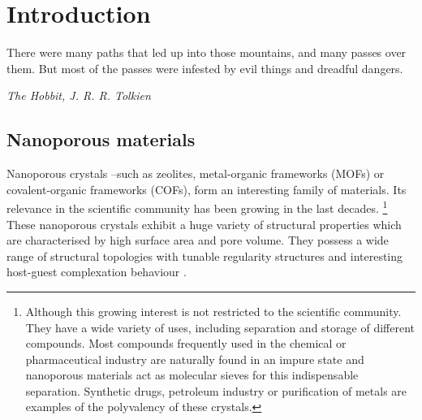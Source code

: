 
\chapter{Introduction}
\label{chap_intro}
\epigraph{There were many paths that led up into those mountains, and many passes over them. But most of the passes were infested by evil things and dreadful dangers.}{\textit{The Hobbit, J. R. R. Tolkien}}
\section{Nanoporous materials}
Nanoporous crystals --such as zeolites, metal-organic frameworks (MOFs) or covalent-organic frameworks (COFs), form an interesting family of materials.
Its relevance in the scientific community has been growing in the last decades.
\footnote{Although this growing interest is not restricted to the scientific community.
They have a wide variety of uses, including separation and storage of different compounds.
Most compounds frequently used in the chemical or pharmaceutical industry are naturally found in an impure state and nanoporous materials act as molecular sieves for this indispensable separation.
Synthetic drugs, petroleum industry or purification of metals are examples of the polyvalency of these crystals.}
These nanoporous crystals exhibit a huge variety of structural properties which are characterised by high surface area and pore volume. They possess a wide range of structural topologies with tunable regularity structures and interesting host-guest complexation behaviour \cite{Horike2009}. 
